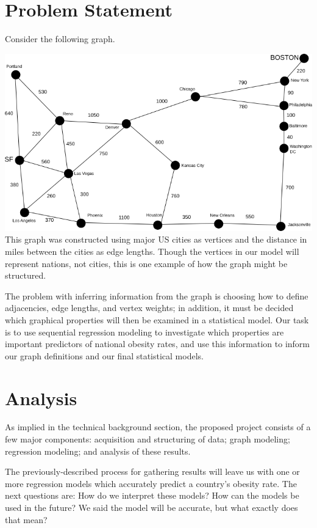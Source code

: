 \documentclass[oneside,12pt]{report}
\begin{document}
\chapter{Problem Statement}

Consider the following graph.

\includegraphics[width=\textwidth]{graph_map_of_us.png}\\

This graph was constructed using major US cities as vertices and the distance in miles between the cities as edge lengths. Though the vertices in our model will represent nations, not cities, this is one example of how the graph might be structured.

The problem with inferring information from the graph is choosing how to define adjacencies, edge lengths, and vertex weights; in addition,
it must be decided which graphical properties will then be examined in a statistical model. Our task is to use sequential regression modeling to
investigate which properties are important predictors of national obesity rates, and use this information to inform our graph definitions and our final statistical models.

\chapter{Analysis}

As implied in the technical background section, the proposed project consists of a few major components: acquisition and structuring of data; graph modeling; regression modeling; and analysis of these results.

The previously-described process for gathering results will leave us with one or more regression models which accurately predict a country's obesity rate. The next questions are: How do we interpret these models? How can the models be used in the future?  We said the model will be accurate, but what exactly does that mean?
\end{document}
